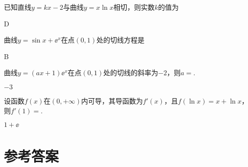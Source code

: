   \begin{exercise}
    \item %
      已知直线$y=kx-2$与曲线$y=x\ln x$相切，则实数$k$的值为\xz
      \begin{answer}
        D
      \end{answer}
    \item %
      曲线$y=\sin x+\ee^x$在点$(0,1)$处的切线方程是\xz
      \begin{answer}
        B
      \end{answer}
    \item %
      曲线$y=(ax+1)\ee^x$在点$(0,1)$处的切线的斜率为$-2$，则$a=$\tk.
      \begin{answer}
        $-3$
      \end{answer}
    \item %
      设函数$f(x)$在$(0,+\infty)$内可导，其导函数为$f'(x)$，且$f(\ln x)=x+\ln x$，则$f'(1)=$\tk.
      \begin{answer}
        $1+\ee$
      \end{answer}
  \end{exercise}
\stopexercise

\newpage
\section{参考答案}
\begin{multicols}{2}
  \printanswer
\end{multicols}
